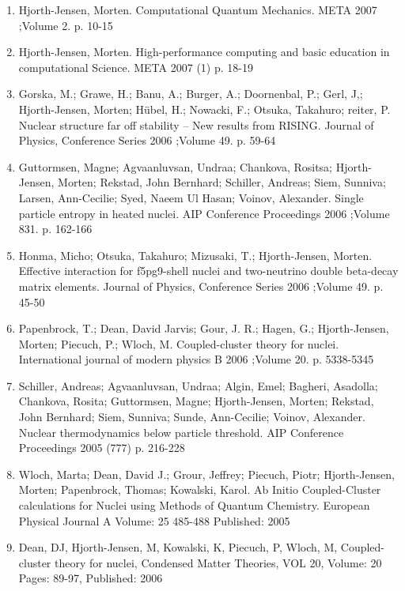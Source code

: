 \documentclass[a4wide,10pt]{article}
\begin{document}
\begin{enumerate}
\item Hjorth-Jensen, Morten.  Computational Quantum Mechanics. META 2007 ;Volume 2. p. 10-15

\item Hjorth-Jensen, Morten.  High-performance computing and basic education in computational Science. META 2007 (1) p. 18-19

\item Gorska, M.; Grawe, H.; Banu, A.; Burger, A.; Doornenbal, P.; Gerl, J,; Hjorth-Jensen, Morten; Hübel, H.; Nowacki, F.; Otsuka, Takahuro; reiter, P.  Nuclear structure far off stability – New results from RISING. Journal of Physics, Conference Series 2006 ;Volume 49. p. 59-64

\item Guttormsen, Magne; Agvaanluvsan, Undraa; Chankova, Rositsa; Hjorth-Jensen, Morten; Rekstad, John Bernhard; Schiller, Andreas; Siem, Sunniva; Larsen, Ann-Cecilie; Syed, Naeem Ul Hasan; Voinov, Alexander.  Single particle entropy in heated nuclei. AIP Conference Proceedings 2006 ;Volume 831. p. 162-166

\item Honma, Micho; Otsuka, Takahuro; Mizusaki, T.; Hjorth-Jensen, Morten.  Effective interaction for f5pg9-shell nuclei and two-neutrino double beta-decay matrix elements. Journal of Physics, Conference Series 2006 ;Volume 49. p. 45-50

\item Papenbrock, T.; Dean, David Jarvis; Gour, J. R.; Hagen, G.; Hjorth-Jensen, Morten; Piecuch, P.; Wloch, M.  Coupled-cluster theory for nuclei. International journal of modern physics B 2006 ;Volume 20. p. 5338-5345

\item Schiller, Andreas; Agvaanluvsan, Undraa; Algin, Emel; Bagheri, Asadolla; Chankova, Rosita; Guttormsen, Magne; Hjorth-Jensen, Morten; Rekstad, John Bernhard; Siem, Sunniva; Sunde, Ann-Cecilie; Voinov, Alexander.  Nuclear thermodynamics below particle threshold. AIP Conference Proceedings 2005 (777) p. 216-228

\item Wloch, Marta; Dean, David J.; Grour, Jeffrey; Piecuch, Piotr; Hjorth-Jensen, Morten; Papenbrock, Thomas; Kowalski, Karol.  Ab Initio Coupled-Cluster calculations for Nuclei using Methods of Quantum Chemistry. European Physical Journal A  Volume: 25  485-488   Published: 2005

\item Dean, DJ, Hjorth-Jensen, M, Kowalski, K, Piecuch, P, Wloch, M, Coupled-cluster theory for nuclei, Condensed Matter Theories, VOL 20, Volume: 20  Pages: 89-97, Published: 2006


\end{enumerate}
\end{document}
